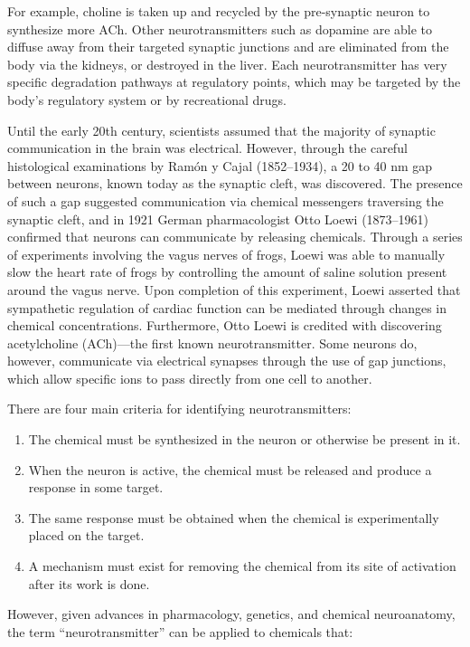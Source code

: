 \documentclass[]{book}
\providecommand{\tightlist}{%
  \setlength{\itemsep}{0pt}\setlength{\parskip}{0pt}}
\begin{document}
For example, choline is taken up and recycled by the pre-synaptic neuron to synthesize more ACh. Other neurotransmitters such as dopamine are able to diffuse away from their targeted synaptic junctions and are eliminated from the body via the kidneys, or destroyed in the liver. Each neurotransmitter has very specific degradation pathways at regulatory points, which may be targeted by the body's regulatory system or by recreational drugs.

Until the early 20th century, scientists assumed that the majority of synaptic communication in the brain was electrical. However, through the careful histological examinations by Ramón y Cajal (1852--1934), a 20 to 40 nm gap between neurons, known today as the synaptic cleft, was discovered. The presence of such a gap suggested communication via chemical messengers traversing the synaptic cleft, and in 1921 German pharmacologist Otto Loewi (1873--1961) confirmed that neurons can communicate by releasing chemicals. Through a series of experiments involving the vagus nerves of frogs, Loewi was able to manually slow the heart rate of frogs by controlling the amount of saline solution present around the vagus nerve. Upon completion of this experiment, Loewi asserted that sympathetic regulation of cardiac function can be mediated through changes in chemical concentrations. Furthermore, Otto Loewi is credited with discovering acetylcholine (ACh)---the first known neurotransmitter. Some neurons do, however, communicate via electrical synapses through the use of gap junctions, which allow specific ions to pass directly from one cell to another.

There are four main criteria for identifying neurotransmitters:

\begin{enumerate}
\def\labelenumi{\arabic{enumi}.}
\tightlist
\item
  The chemical must be synthesized in the neuron or otherwise be present in it.
\item
  When the neuron is active, the chemical must be released and produce a response in some target.
\item
  The same response must be obtained when the chemical is experimentally placed on the target.
\item
  A mechanism must exist for removing the chemical from its site of activation after its work is done.
\end{enumerate}

However, given advances in pharmacology, genetics, and chemical neuroanatomy, the term ``neurotransmitter'' can be applied to chemicals that:
\end{document}
